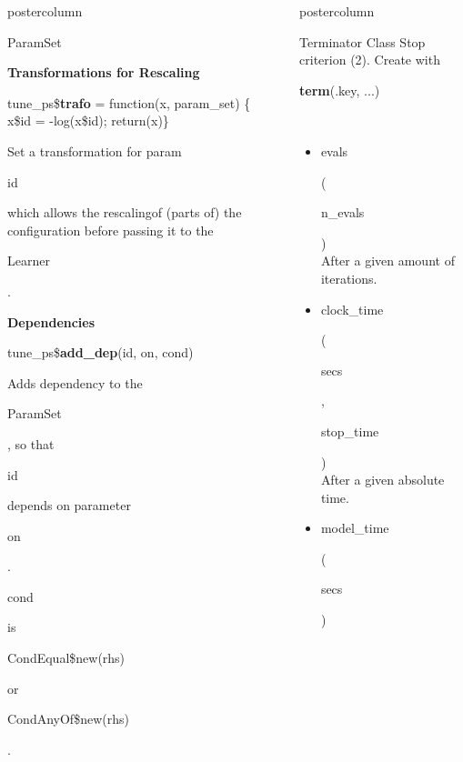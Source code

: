 \documentclass{beamer}
\newlength{\columnheight} %
\newcommand{\codeinline}[1]{\begin{codeboxinline}#1\end{codeboxinline}}
\newcommand{\sectionheading}[1]{{\color{mlrblue}\large\raggedright\textbf{#1}}\vspace{1em}}
\begin{document}
\begin{frame}[fragile]{}
\begin{columns}
\begin{column}{.245\textwidth}
\begin{beamercolorbox}[center]{postercolumn}
\begin{minipage}{.98\textwidth}
{\begin{myblock}{ParamSet}
                            \sectionheading{Transformations for Rescaling}
							\begin{codeboxmultiline}[width=25.5cm]
								tune\_ps\$\textbf{trafo} = function(x, param\_set) \{\\
								\hspace*{1ex}x\$id = -log(x\$id); return(x)\}      
							\end{codeboxmultiline}
							Set a transformation for param \codeinline{id} which  
                            allows the rescalingof (parts of) the configuration 
							before passing it to the \codeinline{Learner}.
                            \vspace{1em}
							\\
                            \sectionheading{Dependencies}
							\begin{codebox}
								tune\_ps\$\textbf{add\_dep}(id, on, cond)
							\end{codebox}
							Adds dependency to the \codeinline{ParamSet}, 
							so that \codeinline{id} depends on parameter \codeinline{on}.
							\codeinline{cond} is \codeinline{CondEqual\$new(rhs)} or \codeinline{CondAnyOf\$new(rhs)}.
						\end{myblock}
						\vfill}
				\end{minipage}
			\end{beamercolorbox}
		\end{column}
		\begin{column}{.245\textwidth}
			\begin{beamercolorbox}[center]{postercolumn}
				\begin{minipage}{.98\textwidth}
					\parbox[t][\columnheight]{\textwidth}{
						\begin{myblock}{Terminator Class}
							Stop criterion (2). Create with \codeinline{\textbf{term}(.key, ...)}
							\\
							\begin{itemize}
                                \item \codeinline{evals}
                                (\codeinline{n\_evals})\\
                                After a given amount of iterations.
								\item \codeinline{clock\_time} 
								(\codeinline{secs}, \codeinline{stop\_time})\\
								After a given absolute time.
								\item \codeinline{model\_time}
								(\codeinline{secs })\\

\end{itemize}
\end{myblock}}
\end{minipage}
\end{beamercolorbox}
\end{column}
\end{columns}
\end{frame}
\end{document}
